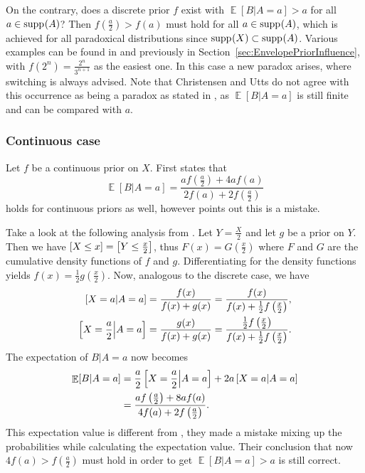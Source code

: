 \documentclass[a4paper]{report}
\theoremstyle{plain}
\theoremstyle{definition}
\theoremstyle{remark}
\numberwithin{equation}{chapter}
\let\P\relax
\DeclareMathOperator{\P}{\mathbb{P}}
\DeclareMathOperator{\E}{\mathbb{E}}
\DeclareMathOperator{\1}{\mathbbm{1}}
\DeclareMathOperator{\supp}{supp}
\begin{document}
On the contrary, does a discrete prior $f$ exist with $\E[B|A=a]>a$ for all $a\in\supp_{\P}(A)$? Then $f\left(\frac{a}{2}\right)>f(a)$ must hold for all $a\in\supp_{\P}(A)$, which is achieved for all paradoxical distributions since $\supp_{\P}(X)\subset\supp_{\P}(A)$. Various examples can be found in \cite{Christensen93a,Linzer94,Broome95} and previously in Section~\ref{sec:EnvelopePriorInfluence}, with $f(2^n)=\frac{2^n}{3^{n+1}}$ as the easiest one. In this case a new paradox arises, where switching is always advised. Note that Christensen and Utts do not agree with this occurrence as being a paradox as stated in \cite{Christensen93a}, as $\E[B|A=a]$ is still finite and can be compared with $a$.

\subsubsection{Continuous case}
Let $f$ be a continuous prior on $X$. First \cite{Christensen92} states that
\begin{equation}
\E[B|A=a]=\frac{af\left(\frac{a}{2}\right)+4af(a)}{2f(a)+2f\left(\frac{a}{2}\right)}
\end{equation}
holds for continuous priors as well, however \cite{Christensen96} points out this is a mistake.

Take a look at the following analysis from \cite{Brams95}. Let $Y=\frac{X}{2}$ and let $g$ be a prior on $Y$. Then we have $\P[X\leq x]=\P\left[Y\leq \frac{x}{2}\right]$, thus $F(x)=G\left(\frac{x}{2}\right)$ where $F$ and $G$ are the cumulative density functions of $f$ and $g$. Differentiating for the density functions yields $f(x)=\frac{1}{2}g\left(\frac{x}{2}\right)$. Now, analogous to the discrete case, we have
\begin{align}
\P[X=a|A=a]&=\frac{f(x)}{f(x)+g(x)}=\frac{f(x)}{f(x)+\frac{1}{2}f\left(\frac{x}{2}\right)},\\
\P\left[X=\frac{a}{2}\middle|A=a\right]&=\frac{g(x)}{f(x)+g(x)}=\frac{\frac{1}{2}f\left(\frac{x}{2}\right)}{f(x)+\frac{1}{2}f\left(\frac{x}{2}\right)}.
\end{align}
The expectation of $B|A=a$ now becomes
\begin{align}
\E[B|A=a]&=\frac{a}{2}\P\left[X=\frac{a}{2}\middle|A=a\right]+2a\P\left[X=a\middle|A=a\right]\\
&=\frac{af\left(\frac{a}{2}\right)+8af(a)}{4f(a)+2f\left(\frac{a}{2}\right)}.
\end{align}
This expectation value is different from \cite{Christensen96}, they made a mistake mixing up the probabilities while calculating the expectation value. Their conclusion that now $4f(a)>f\left(\frac{a}{2}\right)$ must hold in order to get $\E[B|A=a]>a$ is still correct.
\end{document}

